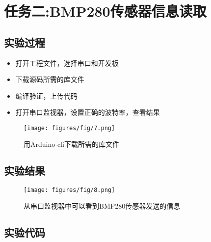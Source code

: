 \documentclass[12pt,hyperref,a4paper,UTF8]{ctexart}
\begin{document}
\section{任务二:BMP280传感器信息读取}

\subsection{实验过程}
\begin{itemize}[]
    \item 打开工程文件，选择串口和开发板
    \item 下载源码所需的库文件
    \item 编译验证，上传代码
    \item 打开串口监视器，设置正确的波特率，查看结果
\end{itemize}

    \begin{figure}[H]
        \centering
        \texttt{[image: figures/fig/7.png]}
        \caption{用Arduino-cli下载所需的库文件}
        \label{fig:enter-label}
    \end{figure}


\newpage
\subsection{实验结果}
    \begin{figure}[H]
        \centering
        \texttt{[image: figures/fig/8.png]}
        \caption{从串口监视器中可以看到BMP280传感器发送的信息}
        \label{fig:enter-label}
    \end{figure}
\subsection{实验代码}
\end{document}

